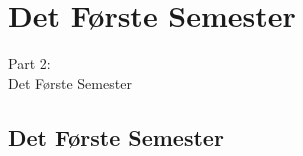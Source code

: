 \documentclass[t, aspectratio=169]{beamer}
\begin{document}
\section{Det Første Semester}
\begin{frame}
  \vspace{25mm}
  \begin{center}
    \Huge{Part 2:\\Det Første Semester}
  \end{center}
\end{frame}

\subsection{Det Første Semester}
\end{document}
